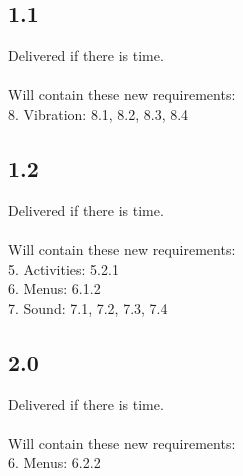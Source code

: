 \documentclass[a4paper,titlepage]{article}
\begin{document}
\subsection*{1.1}
Delivered if there is time.\\\\
Will contain these new requirements:\\
8. Vibration: 8.1, 8.2, 8.3, 8.4

\subsection*{1.2}
Delivered if there is time.\\\\
Will contain these new requirements:\\
5. Activities: 5.2.1\\
6. Menus: 6.1.2\\
7. Sound: 7.1, 7.2, 7.3, 7.4

\subsection*{2.0}
Delivered if there is time.\\\\
Will contain these new requirements:\\
6. Menus: 6.2.2
\end{document}
